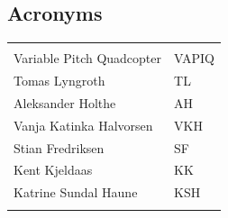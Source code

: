 \documentclass{article}
\begin{document}
\vspace*{3.0 cm}

\begin{center}
\section*{\textbf{Acronyms}}
\begin{tabular}{ll}
\rowcolor{cadetgrey}
    &   \\
Variable Pitch Quadcopter   & VAPIQ \\\rowcolor{gainsboro}
Tomas Lyngroth       & TL          \\ 
Aleksander Holthe      & AH          \\\rowcolor{gainsboro}
Vanja Katinka Halvorsen     & VKH   \\
Stian Fredriksen      & SF          \\\rowcolor{gainsboro}
Kent Kjeldaas         & KK          \\
Katrine Sundal Haune  & KSH         \\\rowcolor{gainsboro}
\end{tabular}                                                             
\end{center}
\newpage




%


\tableofcontents
\newpage



\newpage


%

%




%
\end{document}
